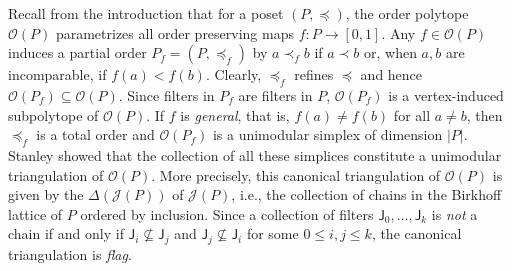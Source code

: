\documentclass[11pt]{amsart}
\theoremstyle{definition}
\begin{document}
Recall from the introduction that for a poset $({P},\preceq)$, the order
polytope ${\mathcal{O}({P})}$ parametrizes all order preserving maps $f : {P} \rightarrow
[0,1]$. Any $f \in {\mathcal{O}({P})}$ induces a partial order ${P}_f =
({P},\preceq_f)$ by $a \prec_f b$ if $a \prec b$ or, when $a,b$ are
incomparable, if $f(a) < f(b)$. Clearly, $\preceq_f$ refines $\preceq$ and
hence ${\mathcal{O}({{P}_f})} \subseteq {\mathcal{O}({P})}$. Since filters in ${P}_f$ are filters in
${P}$, ${\mathcal{O}({{P}_f})}$ is a vertex-induced subpolytope of ${\mathcal{O}({P})}$. If $f$ is
\emph{general}, that is, $f(a) \neq f(b)$ for all $a \neq b$, then $\preceq_f$
is a total order and ${\mathcal{O}({{P}_f})}$ is a unimodular simplex of dimension $|{P}|$.
Stanley showed that the collection of all these simplices constitute a
unimodular triangulation of ${\mathcal{O}({P})}$. More precisely, this canonical
triangulation of ${\mathcal{O}({P})}$ is given by the {\textbf{\color{black}{order complex}}}
$\Delta({{\mathcal{J}}({P})})$ of ${{\mathcal{J}}({P})}$, i.e., the collection of chains in the
Birkhoff lattice of ${P}$ ordered by inclusion.  Since a collection of filters
${\mathsf{J}}_0,\dots,{\mathsf{J}}_k$ is \emph{not} a chain if and only if ${\mathsf{J}}_i
\not\subseteq {\mathsf{J}}_j$ and ${\mathsf{J}}_j \not\subseteq {\mathsf{J}}_i$ for some $0
\le i,j \le k$, the canonical triangulation is \emph{flag}.
\end{document}
